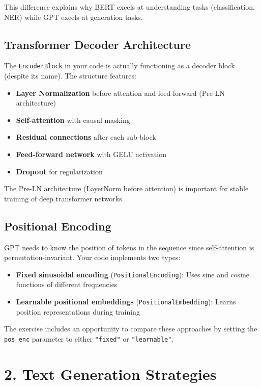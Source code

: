 This difference explains why BERT excels at understanding tasks (classification, NER) while GPT excels at generation tasks.

\subsection*{Transformer Decoder Architecture}

The \texttt{EncoderBlock} in your code is actually functioning as a decoder block (despite its name). The structure features:

\begin{itemize}
    \item \textbf{Layer Normalization} before attention and feed-forward (Pre-LN architecture)
    \item \textbf{Self-attention} with causal masking
    \item \textbf{Residual connections} after each sub-block
    \item \textbf{Feed-forward network} with GELU activation
    \item \textbf{Dropout} for regularization
\end{itemize}

The Pre-LN architecture (LayerNorm before attention) is important for stable training of deep transformer networks.

\subsection*{Positional Encoding}

GPT needs to know the position of tokens in the sequence since self-attention is permutation-invariant. Your code implements two types:

\begin{itemize}
    \item \textbf{Fixed sinusoidal encoding} (\texttt{PositionalEncoding}): Uses sine and cosine functions of different frequencies
    \item \textbf{Learnable positional embeddings} (\texttt{PositionalEmbedding}): Learns position representations during training
\end{itemize}

The exercise includes an opportunity to compare these approaches by setting the \texttt{pos\_enc} parameter to either \texttt{"fixed"} or \texttt{"learnable"}.
\section*{2. Text Generation Strategies}

